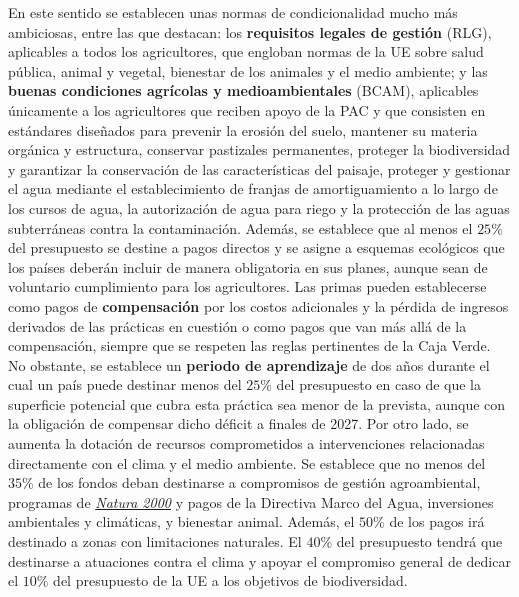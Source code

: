 \documentclass[10pt,a4paper]{article}
\begin{document}
En este sentido se establecen unas normas de condicionalidad mucho más ambiciosas, entre las que destacan: los \textbf{requisitos legales de gestión} (RLG), aplicables a todos los agricultores, que engloban normas de la UE sobre salud pública, animal y vegetal, bienestar de los animales y el medio ambiente; y las \textbf{buenas condiciones agrícolas y medioambientales} (BCAM), aplicables únicamente a los agricultores que reciben apoyo de la PAC y que consisten en estándares diseñados para prevenir la erosión del suelo, mantener su materia orgánica y estructura, conservar pastizales permanentes, proteger la biodiversidad y garantizar la conservación de las características del paisaje, proteger y gestionar el agua mediante el establecimiento de franjas de amortiguamiento a lo largo de los cursos de agua, la autorización de agua para riego y la protección de las aguas subterráneas contra la contaminación. Además, se establece que al menos el $25\%$ del presupuesto se destine a pagos directos y se asigne a esquemas ecológicos que los países deberán incluir de manera obligatoria en sus planes, aunque sean de voluntario cumplimiento para los agricultores. Las primas pueden establecerse como pagos de \textbf{compensación} por los costos adicionales y la pérdida de ingresos derivados de las prácticas en cuestión o como pagos que van más allá de la compensación, siempre que se respeten las reglas pertinentes de la Caja Verde. No obstante, se establece un \textbf{periodo de aprendizaje} de dos años durante el cual un país puede destinar menos del $25\%$ del presupuesto en caso de que la superficie potencial que cubra esta práctica sea menor de la prevista, aunque con la obligación de compensar dicho déficit a finales de 2027. Por otro lado, se aumenta la dotación de recursos comprometidos a intervenciones relacionadas directamente con el clima y el medio ambiente. Se establece que no menos del $35\%$ de los fondos deban destinarse a compromisos de gestión agroambiental, programas de \href{https://es.wikipedia.org/wiki/Red_Natura_2000}{\textit{Natura 2000}} y pagos de la Directiva Marco del Agua, inversiones ambientales y climáticas, y bienestar animal. Además, el $50\%$ de los pagos irá destinado a zonas con limitaciones naturales. El $40\%$ del presupuesto tendrá que destinarse a atuaciones contra el clima y apoyar el compromiso general de dedicar el $10\%$ del presupuesto de la UE a los objetivos de biodiversidad.
\end{document}

